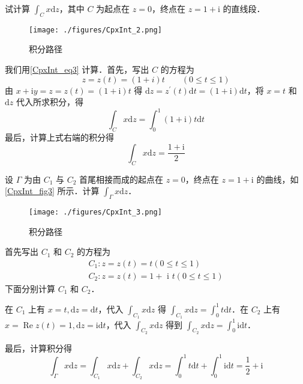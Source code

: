 \begin{example}{} \label{CpxInt_ex1}
试计算 $\displaystyle \int_{C} x \mathrm{d} z$，其中 $C$ 为起点在 $z = 0$，终点在 $z =1+\mathrm i$ 的直线段．
\begin{figure}[ht]
\centering
\texttt{[image: ./figures/CpxInt\_2.png]}
\caption{积分路径} \label{CpxInt_fig2}
\end{figure}

我们用\autoref{CpxInt_eq3} 计算．首先，写出 $C$ 的方程为
\begin{equation}
z=z(t)=(1+i) t \qquad (0 \leqslant t \leqslant 1)
\end{equation}
由 $x+\mathrm{i} y=z=z(t)=(1+\mathrm{i}) t$ 得 $\mathrm{d} z=z^{\prime}(t) \mathrm{d} t=(1+\mathrm{i}) \mathrm{d} t$，将 $x=t$ 和 $\mathrm dz$ 代入所求积分，得
\begin{equation}
\int_{C} x \mathrm{d} z=\int_{0}^{1}(1+\mathrm{i}) t \mathrm{d} t
\end{equation}
最后，计算上式右端的积分得
\begin{equation}
\int_{C} x \mathrm{d} z=\frac{1+\mathrm{i}}{2}
\end{equation}
\end{example}

\begin{example}{} \label{CpxInt_ex2}
设 $\Gamma$ 为由 $C_1$ 与 $C_2$ 首尾相接而成的起点在 $z=0$，终点在 $ z =1+ \mathrm i $ 的曲线，如\autoref{CpxInt_fig3} 所示．计算 $\displaystyle \int_{\Gamma} x \mathrm{d}z$．
\begin{figure}[ht]
\centering
\texttt{[image: ./figures/CpxInt\_3.png]}
\caption{积分路径} \label{CpxInt_fig3}
\end{figure}

首先写出 $C_1$ 和 $C_2$ 的方程为
\begin{equation}
\begin{array}{l}C_{1}: z=z(t)=t(0 \leqslant t \leqslant 1) \\ C_{2}: z=z(t)=1+\text { i }t(0 \leqslant t \leqslant 1)\end{array}
\end{equation}
下面分别计算 $C_1$ 和 $C_2$．

在 $C_1$ 上有 $x=t, \mathrm{d} z=\mathrm{d} t$，代入 $\displaystyle \int_{C_{1}} x \mathrm{d} z$ 得 $\displaystyle \int_{C_{1}} x \mathrm{d} z=\int_{0}^{1} t \mathrm{d} t$．在 $C_2$ 上有 $\displaystyle x=\operatorname{Re} z(t)=1, \mathrm{d} z=\mathrm{id} t$，代入 $\displaystyle \int_{C_{2}} x \mathrm{d} z$ 得到 $\displaystyle \int_{C_{2}} x \mathrm{d} z=\int_{0}^{1} \mathrm{id} t$．

最后，计算积分得
\begin{equation}
\int_{\Gamma} x \mathrm{d} z=\int_{C_{1}} x \mathrm{d} z+\int_{C_{2}} x \mathrm{d} z=\int_{0}^{1} t \mathrm{d} t+\int_{0}^{1} \mathrm{i} \mathrm{d} t=\frac{1}{2}+\mathrm{i}
\end{equation}
\end{example}

